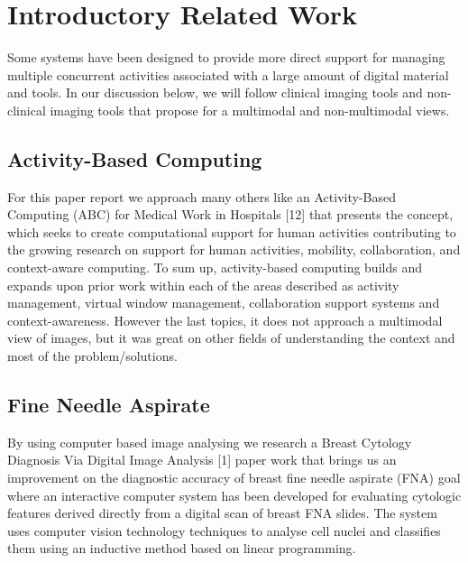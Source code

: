 \clearpage

\section{Introductory Related Work}

Some systems have been designed to provide more direct support for managing multiple concurrent activities associated with a large amount of digital material and tools. In our discussion below, we will follow clinical imaging tools and non-clinical imaging tools that propose for a multimodal and non-multimodal views.

\subsection{Activity-Based Computing}

For this paper report we approach many others like an Activity-Based Computing (ABC) for Medical Work in Hospitals [12] that presents the concept, which seeks to create computational support for human activities contributing to the growing research on support for human activities, mobility, collaboration, and context-aware computing. To sum up, activity-based computing builds and expands upon prior work within each of the areas described as activity management, virtual window management, collaboration support systems and context-awareness. However the last topics, it does not approach a multimodal view of images, but it was great on other fields of understanding the context and most of the problem/solutions.

\subsection{Fine Needle Aspirate}

By using computer based image analysing we research a Breast Cytology Diagnosis Via Digital Image Analysis [1] paper work that brings us an improvement on the diagnostic accuracy of breast fine needle aspirate (FNA) goal where an interactive computer system has been developed for evaluating cytologic features derived directly from a digital scan of breast FNA slides. The system uses computer vision technology techniques to analyse cell nuclei and classifies them using an inductive method based on linear programming.

\clearpage

